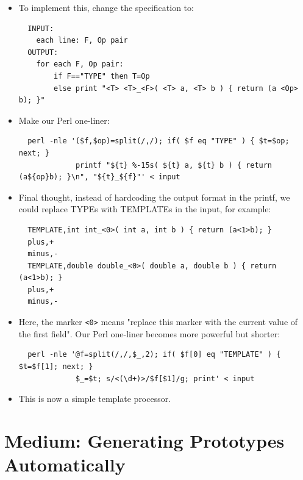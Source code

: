 \documentclass[handout,]{beamer}
\newcommand{\pitem}{\pause \item}
\begin{document}
\begin{frame}[fragile]
    \begin{itemize}
\item
To implement this, change the specification to:

\tiny
\begin{verbatim}
  INPUT:
    each line: F, Op pair
  OUTPUT:
    for each F, Op pair:
        if F=="TYPE" then T=Op
        else print "<T> <T>_<F>( <T> a, <T> b ) { return (a <Op> b); }"
\end{verbatim}
\small

\item
Make our Perl one-liner:

\tiny
\begin{verbatim}
  perl -nle '($f,$op)=split(/,/); if( $f eq "TYPE" ) { $t=$op; next; }
             printf "${t} %-15s( ${t} a, ${t} b ) { return (a${op}b); }\n", "${t}_${f}"' < input
\end{verbatim}
\small


\pitem
Final thought, instead of hardcoding the output format in the printf,
we could replace TYPEs with TEMPLATEs in the input, for example:

\tiny
\begin{verbatim}
  TEMPLATE,int int_<0>( int a, int b ) { return (a<1>b); }
  plus,+
  minus,-
  TEMPLATE,double double_<0>( double a, double b ) { return (a<1>b); }
  plus,+
  minus,-
\end{verbatim}
\small

\item
Here, the marker \verb+<0>+ means
"replace this marker with the current value of the first field".
Our Perl one-liner becomes more powerful but shorter:

\tiny
\begin{verbatim}
  perl -nle '@f=split(/,/,$_,2); if( $f[0] eq "TEMPLATE" ) { $t=$f[1]; next; }
             $_=$t; s/<(\d+)>/$f[$1]/g; print' < input
\end{verbatim}
\small

\item
This is now a simple template processor.

    \end{itemize}
\end{frame}

\section{Medium: Generating Prototypes Automatically}
\end{document}
